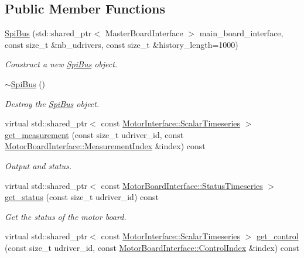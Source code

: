 \subsection*{Public Member Functions}
\begin{DoxyCompactItemize}
\item 
\hyperlink{classblmc__drivers_1_1SpiBus_a020b550fdd3c00a5361f0bee0382dbe2}{Spi\+Bus} (std\+::shared\+\_\+ptr$<$ Master\+Board\+Interface $>$ main\+\_\+board\+\_\+interface, const size\+\_\+t \&nb\+\_\+udrivers, const size\+\_\+t \&history\+\_\+length=1000)
\begin{DoxyCompactList}\small\item\em Construct a new \hyperlink{classblmc__drivers_1_1SpiBus}{Spi\+Bus} object. \end{DoxyCompactList}\item 
\hyperlink{classblmc__drivers_1_1SpiBus_a0c711c24c403c532c5d5bccfa5c1dc68}{$\sim$\+Spi\+Bus} ()
\begin{DoxyCompactList}\small\item\em Destroy the \hyperlink{classblmc__drivers_1_1SpiBus}{Spi\+Bus} object. \end{DoxyCompactList}\item 
virtual std\+::shared\+\_\+ptr$<$ const \hyperlink{classblmc__drivers_1_1MotorInterface_a49b8fc916b9f9debbd7b0988463db5cd}{Motor\+Interface\+::\+Scalar\+Timeseries} $>$ \hyperlink{classblmc__drivers_1_1SpiBus_a2f70f7c7d6a0fc22f03d0ca407f0c01b}{get\+\_\+measurement} (const size\+\_\+t udriver\+\_\+id, const \hyperlink{classblmc__drivers_1_1MotorBoardInterface_a8e869cbdb9fcc872ba5a33813e0dfafb}{Motor\+Board\+Interface\+::\+Measurement\+Index} \&index) const
\begin{DoxyCompactList}\small\item\em Output and status. \end{DoxyCompactList}\item 
virtual std\+::shared\+\_\+ptr$<$ const \hyperlink{classblmc__drivers_1_1MotorBoardInterface_ae3777e484dda60c4abe87f2b542ddfb8}{Motor\+Board\+Interface\+::\+Status\+Timeseries} $>$ \hyperlink{classblmc__drivers_1_1SpiBus_a80113b000cb68ee9869235ed42a3c547}{get\+\_\+status} (const size\+\_\+t udriver\+\_\+id) const
\begin{DoxyCompactList}\small\item\em Get the status of the motor board. \end{DoxyCompactList}\item 
virtual std\+::shared\+\_\+ptr$<$ const \hyperlink{classblmc__drivers_1_1MotorInterface_a49b8fc916b9f9debbd7b0988463db5cd}{Motor\+Interface\+::\+Scalar\+Timeseries} $>$ \hyperlink{classblmc__drivers_1_1SpiBus_a06300c7a9b8266966e281c8437a75a1b}{get\+\_\+control} (const size\+\_\+t udriver\+\_\+id, const \hyperlink{classblmc__drivers_1_1MotorBoardInterface_a82ed4d0fa527521707281396095a88ca}{Motor\+Board\+Interface\+::\+Control\+Index} \&index) const

\end{DoxyCompactItemize}
